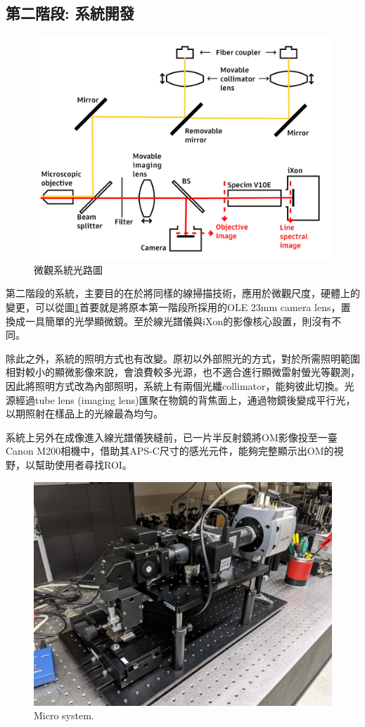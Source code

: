 \documentclass[12pt]{article}
\begin{document}
\subsection{第二階段: 系統開發}
\begin{figure}
    \centering
    \includegraphics[width = 0.9\linewidth]{lightPath2.jpg}
    \caption{微觀系統光路圖}
    \label{fig: micro path}
\end{figure}
第二階段的系統，主要目的在於將同樣的線掃描技術，應用於微觀尺度，硬體上的變更，可以從圖\ref{fig: micro path}首要就是將原本第一階段所採用的OLE 23mm camera lens，置換成一具簡單的光學顯微鏡。至於線光譜儀與iXon的影像核心設置，則沒有不同。

除此之外，系統的照明方式也有改變。原初以外部照光的方式，對於所需照明範圍相對較小的顯微影像來說，會浪費較多光源，也不適合進行顯微雷射螢光等觀測，
因此將照明方式改為內部照明，系統上有兩個光纖collimator，能夠彼此切換。光源經過tube lens (imaging lens)匯聚在物鏡的背焦面上，通過物鏡後變成平行光，以期照射在樣品上的光線最為均勻。

系統上另外在成像進入線光譜儀狹縫前，已一片半反射鏡將OM影像投至一臺Canon M200相機中，借助其APS-C尺寸的感光元件，能夠完整顯示出OM的視野，以幫助使用者尋找ROI。
\begin{figure}
    \centering
    \includegraphics[width=\linewidth]{microSystemPixel3.jpg}
    \caption{Micro system.}
\end{figure}
\end{document}
